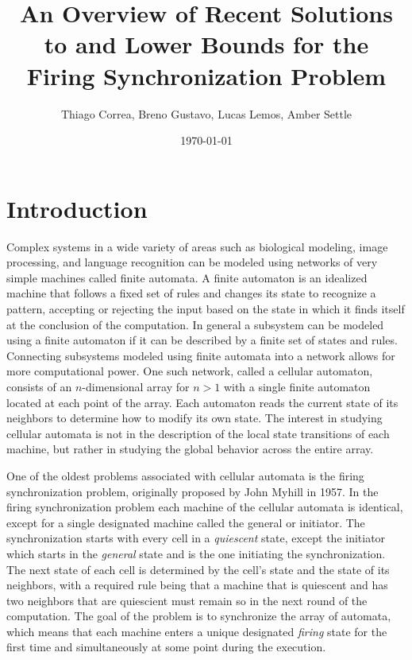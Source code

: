 \documentclass{article}
\begin{document}
\title{An Overview of Recent Solutions to and Lower Bounds for the Firing Synchronization Problem}
\author{Thiago Correa, Breno Gustavo, Lucas Lemos, Amber Settle}
\date{\today}
\maketitle

\section{Introduction}
Complex systems in a wide variety of areas such as biological modeling, image processing, and language recognition can be modeled using networks of very simple machines called finite automata. A finite automaton is an idealized machine that follows a fixed set of rules and changes its state to recognize a pattern, accepting or rejecting the input based on the state in which it finds itself at the conclusion of the computation. In general a subsystem can be modeled using a finite automaton if it can be described by a finite set of states and rules. Connecting subsystems modeled using finite automata into a network allows for more computational power. One such network, called a cellular automaton, consists of an $n$-dimensional array for $n > 1$  with a single finite automaton located at each point of the array. Each automaton reads the current state of its neighbors to determine how to modify its own state. The interest in studying cellular automata is not in the description of the local state transitions of each machine, but rather in studying the global behavior across the entire array.

One of the oldest problems associated with cellular automata is the firing synchronization problem, originally proposed by John Myhill in 1957. In the firing synchronization problem each machine of the cellular automata is identical, except for a single designated machine called the general or initiator.  The synchronization starts with every cell in a \textit{quiescent} state, except the initiator which starts in the \textit{general} state and is the one initiating the synchronization. The next state of each cell is determined by the cell's state and the state of its neighbors, with a required rule being that a machine that is quiescent and has two neighbors that are quiescient must remain so in the next round of the computation. The goal of the problem is to synchronize the array of automata, which means that each machine enters a unique designated \textit{firing} state for the first time and simultaneously at some point during the execution.
    
\end{document}
